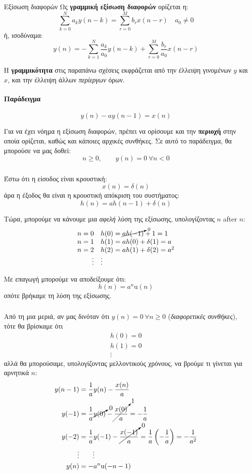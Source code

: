 \documentclass[11pt,a4paper,notitlepage,fleqn]{article}
\begin{document}
\begin{defn}{Εξίσωση διαφορών}{}
	Ως \textbf{γραμμική εξίσωση διαφορών} ορίζεται η:
	\[
	\sum_{k=0}^{N} a_k y(n-k) = \sum_{r=0}^{M} b_r x(n-r)\quad a_0 \neq 0
	\]
	ή, ισοδύναμα:
	\[
	y(n) = -\sum_{k=1}^{N} \frac{a_k}{a_0} y(n-k) + \sum_{r=0}^{M} \frac{b_r}{a_0} x(n-r)
	\]
\end{defn}

Η \textbf{γραμμικότητα} στις παραπάνω σχέσεις εκφράζεται από την έλλειψη γινομένων \( y \) και \( x \),
και την έλλειψη άλλων \emph{περίεργων} όρων.

\paragraph{Παράδειγμα}
\[
y(n) - ay(n-1) = x(n)
\]

Για να έχει νόημα η εξίσωση διαφορών, πρέπει να ορίσουμε και την \textbf{περιοχή} στην οποία
ορίζεται, καθώς και κάποιες αρχικές συνθήκες. Σε αυτό το παράδειγμα, θα μπορούσε να μας δοθεί:
\[
n \geq 0, \qquad y(n) = 0 \ \forall n < 0
\]

\subparagraph{}
Έστω ότι η είσοδος είναι κρουστική: \[
x(n) = \delta(n)
\]
άρα η έξοδος θα είναι η κρουστική απόκριση του συστήματος:
\[
h(n) = ah(n-1) + \delta(n)
\]

Τώρα, μπορούμε να κάνουμε μια \emph{αφελή} λύση της εξίσωσης, υπολογίζοντας \( n \) after \( n \):
\[
\begin{array}{rl}
n=0 & h(0) = \cancelto{0}{ah(-1)}+1 = 1\\
n=1 & h(1) = ah(0) + \delta(1) = a\\
n=2 & h(2) = ah(1) + \delta(2) = a^2\\
\vdots & \vdots 
\end{array}
\]

Με επαγωγή μπορούμε να αποδείξουμε ότι:
\[
h(n) = a^n \mathrm{u}(n)
\]
οπότε βρήκαμε τη λύση της εξίσωσης.

\subparagraph{}
Από τη μια μεριά, αν μας δινόταν ότι \( y(n) = 0\ \forall n \geq 0 \) (\emph{διαφορετικές συνθήκες}), τότε θα βρίσκαμε ότι
\begin{gather*}
	h(0) = 0\\h(1) = 0 \\ \vdots
\end{gather*}
αλλά θα μπορούσαμε, υπολογίζοντας μελλοντικούς χρόνους, να βρούμε τι γίνεται για αρνητικά \( n \):
\begin{align*}
	y(n-1) &= \frac{1}{a}y(n) - \frac{x(n)}{a}\\
	y(-1) &= \frac{1}{a}\cancelto{0}{y(0)} - \cancelto{1}{\frac{x(0)}{a}} = -\frac{1}{a}\\
	y(-2) &= \frac{1}{a}y(-1) - \cancelto{0}{\frac{x(-1)}{a}} = \frac{1}{a}\left(-\frac{1}{a}\right)=-\frac{1}{a^2} \\
	\vdots & \qquad \vdots \\
	y(n) &= -a^n\mathrm u(-n-1)
\end{align*}
\end{document}
